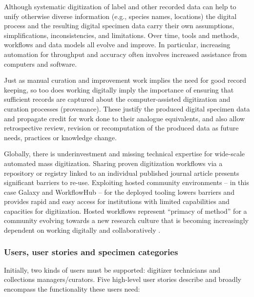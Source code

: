 Although systematic digitization of label and other recorded data can
help to unify otherwise diverse information (e.g., species names,
locations) the digital process and the resulting digital specimen data
carry their own assumptions, simplifications, inconsistencies, and
limitations. Over time, tools and methods, workflows and data models all
evolve and improve. In particular, increasing automation for throughput
and accuracy often involves increased assistance from computers and
software.

Just as manual curation and improvement work implies the need for good
record keeping, so too does working digitally imply the importance of
ensuring that sufficient records are captured about the
computer-assisted digitization and curation processes (provenance).
These justify the produced digital specimen data and propagate credit
for work done to their analogue equivalents, and also allow
retrospective review, revision or recomputation of the produced data as
future needs, practices or knowledge change.

Globally, there is underinvestment and missing technical expertise for
wide-scale automated mass digitization. Sharing proven digitization
workflows via a repository or registry linked to an individual published
journal article presents significant barriers to re-use. Exploiting
hosted community environments -- in this case Galaxy and WorkflowHub --
for the deployed tooling lowers barriers and provides rapid and easy
access for institutions with limited capabilities and capacities for
digitization. Hosted workflows represent ``primacy of method'' for a
community evolving towards a new research culture that is becoming
increasingly dependent on working digitally and collaboratively
\cite{De Roure 2010,Hardisty 2016}.

\subsubsection{Users, user stories and specimen categories}\label{users-user-stories-and-specimen-categories}

Initially, two kinds of users must be supported: digitizer technicians
and collections managers/curators. Five high-level user stories describe
and broadly encompass the functionality these users need:

